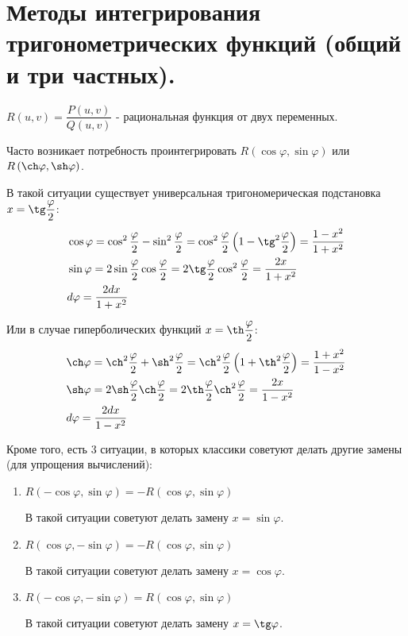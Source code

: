 \documentclass[../main.tex]{subfiles}
\begin{document}
\newpage
\section{Методы интегрирования тригонометрических функций (общий и три частных).}
\( R\left( u,v\right) = \dfrac{ P\left(u,v\right)}{ Q\left( u, v\right)} \) - рациональная функция от двух переменных. 

Часто возникает потребность проинтегрировать \( R\left( \cos \varphi , \sin \varphi \right) \) или \( R\left( \ch \varphi , \sh \varphi \right) \).

В такой ситуации существует универсальная тригономерическая подстановка \( x = \tg \dfrac{ \varphi}{ 2}  \):
\begin{equation*}
    \begin{aligned}
        &\cos \varphi =\cos^2 \dfrac{ \varphi}{ 2}- \sin^2 \dfrac{ \varphi}{ 2}= \cos^2 \dfrac{ \varphi}{ 2} \left( 1- \tg^2 \dfrac{ \varphi}{ 2}  \right)= \dfrac{ 1-x^2}{ 1+x^2}\\
        &\sin \varphi = 2 \sin \dfrac{ \varphi}{ 2} \cos \dfrac{ \varphi}{ 2} = 2 \tg \dfrac{ \varphi}{ 2} \cos^2 \dfrac{ \varphi}{ 2} = \dfrac{ 2x}{ 1+x^2}   \\      
        &d \varphi = \dfrac{ 2dx}{ 1+x^2} 
    \end{aligned}
\end{equation*}

Или в случае гиперболических функций \( x = \th \dfrac{ \varphi}{ 2} \):
\begin{equation*}
    \begin{aligned}
        &\ch \varphi =\ch^2 \dfrac{ \varphi}{ 2}+ \sh^2 \dfrac{ \varphi}{ 2}= \ch^2 \dfrac{ \varphi}{ 2} \left( 1+ \th^2 \dfrac{ \varphi}{ 2}  \right)= \dfrac{ 1+x^2}{ 1-x^2}\\
        &\sh \varphi = 2 \sh \dfrac{ \varphi}{ 2} \ch \dfrac{ \varphi}{ 2} = 2 \th \dfrac{ \varphi}{ 2} \ch^2 \dfrac{ \varphi}{ 2} = \dfrac{ 2x}{ 1-x^2}   \\      
        &d \varphi = \dfrac{ 2dx}{ 1-x^2} 
    \end{aligned}
\end{equation*}

Кроме того, есть 3 ситуации, в которых классики советуют делать другие замены (для упрощения вычислений):
\begin{enumerate}
    \item \( R\left( -\cos \varphi , \sin \varphi \right)=- R\left( \cos \varphi , \sin \varphi \right)  \)
    \par В такой ситуации советуют делать замену \( x = \sin \varphi \).
    \item \( R\left( \cos \varphi , -\sin \varphi \right)=- R\left( \cos \varphi , \sin \varphi \right)  \)
    \par В такой ситуации советуют делать замену \( x = \cos \varphi \).
    \item \( R\left( -\cos \varphi , -\sin \varphi \right)= R\left( \cos \varphi , \sin \varphi \right)  \)
    \par В такой ситуации советуют делать замену \( x = \tg \varphi \).
\end{enumerate}
\end{document}
